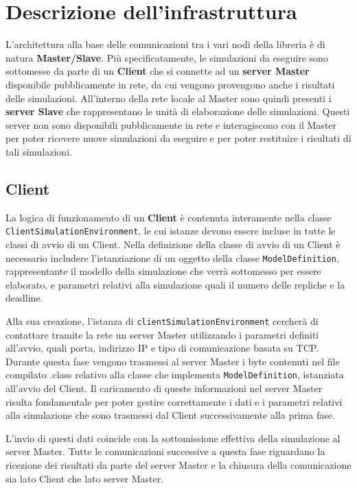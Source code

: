 
\section{Descrizione dell'infrastruttura}
L'architettura alla base delle comunicazioni tra i vari nodi della libreria è di natura \textbf{Master/Slave}.
Più specificatamente, le simulazioni da eseguire sono sottomesse da parte di un \textbf{Client} che si connette ad un \textbf{server Master} disponibile pubblicamente in rete, da cui vengono provengono anche i risultati delle simulazioni. 
All'interno della rete locale al Master sono quindi presenti i \textbf{server Slave} che rappresentano le unità di elaborazione delle simulazioni. Questi server non sono disponibili pubblicamente in rete e interagiscono con il Master per poter ricevere nuove simulazioni da eseguire e per poter restituire i risultati di tali simulazioni.

\subsection{Client}
La logica di funzionamento di un \textbf{Client} è contenuta interamente nella classe \texttt{ClientSimulationEnvironment}, le cui istanze devono essere incluse in tutte le classi di avvio di un Client.
Nella definizione della classe di avvio di un Client è necessario includere l'istanziazione di un oggetto della classe \texttt{ModelDefinition}, rappresentante il modello della simulazione che verrà sottomesso per essere elaborato, e parametri relativi alla simulazione quali il numero delle repliche e la deadline.

Alla sua creazione, l'istanza di \texttt{clientSimulationEnvironment} cercherà di contattare tramite la rete un server Master utilizzando i parametri definiti all'avvio, quali porta, indirizzo IP e tipo di comunicazione basata su TCP. 
Durante questa fase vengono trasmessi al server Master i byte contenuti nel file compilato .class relativo alla classe che implementa \texttt{ModelDefinition}, istanziata all'avvio del Client.
Il caricamento di queste informazioni nel server Master risulta fondamentale per poter gestire correttamente i dati e i parametri relativi alla simulazione che sono trasmessi dal Client successivamente alla prima fase.

L'invio di questi dati coincide con la sottomissione effettiva della simulazione al server Master. 
Tutte le comunicazioni successive a questa fase riguardano la ricezione dei risultati da parte del server Master e la chiusura della comunicazione sia lato Client che lato server Master.

